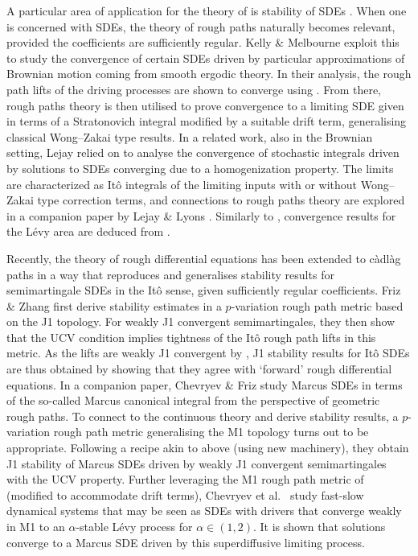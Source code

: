 \documentclass[11pt]{article}
\theoremstyle{definition}\newtheorem{example}[theorem]{Example}
\theoremstyle{definition}\newtheorem{counterexample}[theorem]{Counterexample}
\theoremstyle{definition}\newtheorem{remark}[theorem]{Remark}
\theoremstyle{definition}\newtheorem{defi}[theorem]{Definition}
\numberwithin{equation}{section}
\renewcommand{\|}{\; : \, \;}											%
\begin{document}
A particular area of application for the theory of \cite{jakubowskimeminpages, kurtzprotter} is stability of SDEs \cite{jacod_protter, kurtzprotter, slomisnki}.  When one is concerned with SDEs, the theory of rough paths naturally becomes relevant, provided the coefficients are sufficiently regular. Kelly \& Melbourne \cite{Kelly-Melbourne} exploit this to study the convergence of certain SDEs driven by particular approximations of Brownian motion coming from smooth ergodic theory. In their analysis, the rough path lifts of the driving processes are shown to converge using \cite{jakubowskimeminpages, kurtzprotter}. From there, rough paths theory is then utilised to prove convergence to a limiting SDE given in terms of a Stratonovich integral modified by a suitable drift term, generalising classical Wong--Zakai type results. In a related work, also in the Brownian setting, Lejay \cite{lejay} relied on \cite{jakubowskimeminpages,kurtzprotter} to analyse the convergence of stochastic integrals driven by solutions to SDEs converging due to a homogenization property. The limits are characterized as Itô integrals of the limiting inputs with or without Wong--Zakai type correction terms, and connections to rough paths theory are explored in a companion paper by Lejay \& Lyons \cite{lejay_lyons}. Similarly to \cite{Kelly-Melbourne}, convergence results for the L\'evy area are deduced from \cite{jakubowskimeminpages,kurtzprotter}.

Recently, the theory of rough differential equations has been extended to c\`adl\`ag paths in a way that reproduces and generalises stability results for semimartingale SDEs in the Itô sense, given sufficiently regular coefficients. Friz \& Zhang \cite{friz1} first derive stability estimates in a $p$-variation rough path metric based on the J1 topology. For weakly J1 convergent semimartingales, they then show that the UCV condition implies tightness of the Itô rough path lifts in this metric. As the lifts are weakly J1 convergent by \cite{kurtzprotter}, J1 stability results for It{\^o} SDEs are thus obtained by showing that they agree with `forward' rough differential equations. In a companion paper, Chevryev \& Friz \cite{friz2} study Marcus SDEs in terms of the so-called Marcus canonical integral from the perspective of geometric rough paths. To connect to the continuous theory and derive stability results, a $p$-variation rough path metric generalising the M1 topology turns out to be appropriate. Following a recipe akin to \cite{friz1} above (using new machinery), they obtain J1 stability of Marcus SDEs driven by weakly J1 convergent semimartingales with the UCV property. Further leveraging the M1 rough path metric of \cite{friz2} (modified to accommodate drift terms), Chevryev et al.~\cite{chevryev_etal} study fast-slow dynamical systems that may be seen as SDEs with drivers that converge weakly in M1 to an $\alpha$-stable L\'evy process for $\alpha \in (1,2)$. It is shown that solutions converge to a Marcus SDE driven by this superdiffusive limiting process.
\end{document}
